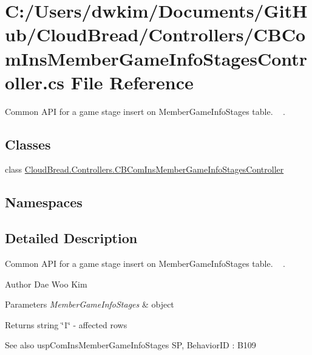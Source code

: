 \hypertarget{a00121}{}\section{C\+:/\+Users/dwkim/\+Documents/\+Git\+Hub/\+Cloud\+Bread/\+Controllers/\+C\+B\+Com\+Ins\+Member\+Game\+Info\+Stages\+Controller.cs File Reference}
\label{a00121}


Common A\+PI for a game stage insert on Member\+Game\+Info\+Stages table. ~\newline
.  


\subsection*{Classes}
\begin{DoxyCompactItemize}
\item 
class \hyperlink{a00010}{Cloud\+Bread.\+Controllers.\+C\+B\+Com\+Ins\+Member\+Game\+Info\+Stages\+Controller}
\end{DoxyCompactItemize}
\subsection*{Namespaces}
\begin{DoxyCompactItemize}
\end{DoxyCompactItemize}


\subsection{Detailed Description}
Common A\+PI for a game stage insert on Member\+Game\+Info\+Stages table. ~\newline
. 

\begin{DoxyAuthor}{Author}
Dae Woo Kim 
\end{DoxyAuthor}

\begin{DoxyParams}{Parameters}
{\em Member\+Game\+Info\+Stages} & object \\
\hline
\end{DoxyParams}
\begin{DoxyReturn}{Returns}
string \char`\"{}1\char`\"{} -\/ affected rows 
\end{DoxyReturn}
\begin{DoxySeeAlso}{See also}
usp\+Com\+Ins\+Member\+Game\+Info\+Stages SP, Behavior\+ID \+: B109 
\end{DoxySeeAlso}
